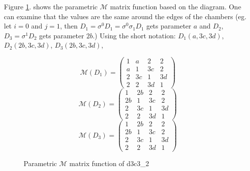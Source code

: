 \documentclass[12pt,a4paper]{article}
\numberwithin{equation}{section}
\theoremstyle{plain}%
\theoremstyle{definition}
\theoremstyle{remark}
\begin{document}
Figure \ref{fig:d3c3_2_pm}. shows the parametric $\mathcal{M}$ matrix function
based on the diagram. One can examine that the values are the same around the
edges of the chambers (eg. let $i=0$ and $j=1$, then
$D_1=\sigma^0D_1=\sigma^0\sigma_1D_1$ gets parameter $a$ and $D_2$,
$D_3=\sigma^1D_2$ gets parameter $2b$.) Using the short notation:
$D_1(a,3c,3d)$, $D_2(2b,3c,3d)$, $D_3(2b,3c,3d)$, 

\begin{figure}
  \caption{\label{fig:d3c3_2_pm} Parametric $\mathcal{M}$ matrix function of d3c3\_2}
  \begin{equation*}
    \mathcal{M}(D_1)=
    \left(
    \begin{array}{cccc}
      1 & a & 2 & 2\\
      a & 1 & 3c & 2\\
      2 & 3c & 1 & 3d\\
      2 & 2 & 3d & 1
    \end{array}
    \right)
  \end{equation*}
  \begin{equation*}
    \mathcal{M}(D_2)=
    \left(
    \begin{array}{cccc}
      1 & 2b & 2 & 2\\
      2b & 1 & 3c & 2\\
      2 & 3c & 1 & 3d\\
      2 & 2 & 3d & 1
    \end{array}
    \right)
  \end{equation*}
  \begin{equation*}
    \mathcal{M}(D_3)=
    \left(
    \begin{array}{cccc}
      1 & 2b & 2 & 2\\
      2b & 1 & 3c & 2\\
      2 & 3c & 1 & 3d\\
      2 & 2 & 3d & 1
    \end{array}
    \right)
  \end{equation*}
\end{figure}
\end{document}
